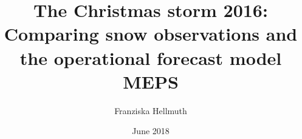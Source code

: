 \makeatletter
\title{The Christmas storm 2016: Comparing snow observations and the operational forecast model MEPS}	\let\Title\@title
\author{Franziska Hellmuth}	\let\Author\@author
\date{June 2018}		\let\Date\@date
\makeatother